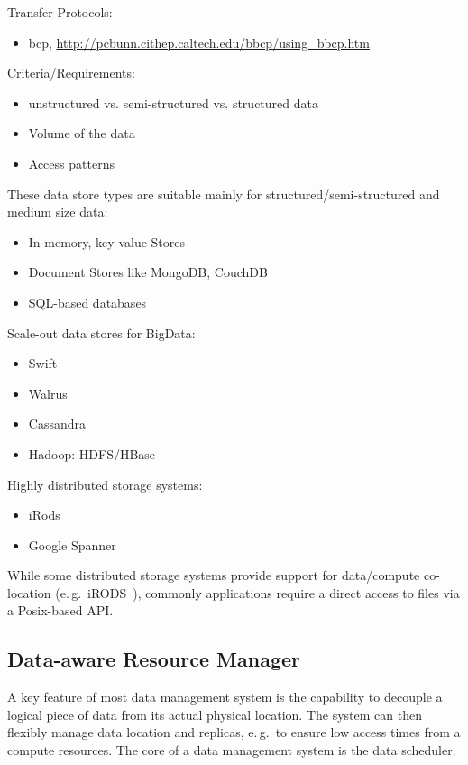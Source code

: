 \documentclass{sig-alternate}
\begin{document}
Transfer Protocols:
\begin{itemize}
	\item bcp, \url{http://pcbunn.cithep.caltech.edu/bbcp/using_bbcp.htm}
\end{itemize}





Criteria/Requirements:
\begin{itemize}
	\item unstructured vs. semi-structured vs. structured data
	\item Volume of the data
	\item Access patterns
\end{itemize}


These data store types are suitable mainly for structured/semi-structured and 
medium size data:
\begin{itemize}
	\item In-memory, key-value Stores
	\item Document Stores like MongoDB, CouchDB 
	\item SQL-based databases
\end{itemize}

Scale-out data stores for BigData:
\begin{itemize}
	\item Swift
	\item Walrus
	\item Cassandra
	\item Hadoop: HDFS/HBase
\end{itemize}


Highly distributed storage systems:
\begin{itemize}
	\item iRods
	\item Google Spanner
\end{itemize}


While some distributed storage systems provide support for data/compute 
co-location (e.\,g.\ iRODS~\cite{Rajasekar:2010:IPI:1855046}), commonly 
applications require a direct access to files via a Posix-based API.

\subsection{Data-aware Resource Manager}

A key feature of most data management system is the capability to decouple a
logical piece of data from its actual physical location. The system can then
flexibly manage data location and replicas, e.\,g.\ to ensure low access times
from a compute resources. The core of a data management system is the data
scheduler.
\end{document}
